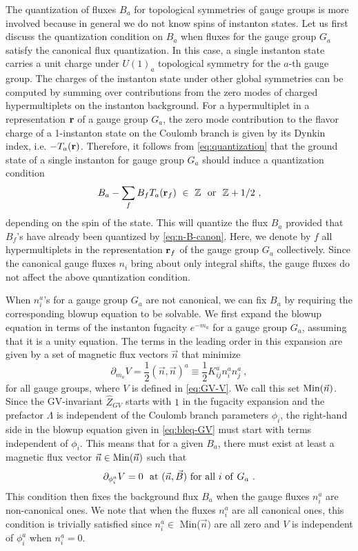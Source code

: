 The quantization of fluxes $B_a$ for topological symmetries of gauge groups is more involved because in general we do not know spins of instanton states. Let us first discuss the quantization condition on $B_a$ when fluxes for the gauge group $G_a$ satisfy the canonical flux quantization. In this case, a single instanton state carries a unit charge under $U(1)_a$ topological symmetry for the $a$-th gauge group. The charges of the instanton state under other global symmetries can be computed by summing over contributions from the zero modes of charged hypermultiplets on the instanton background. For a hypermultiplet in a representation ${\bf r}$ of a gauge group $G_a$, the zero mode contribution to the flavor charge of a 1-instanton state on the Coulomb branch is given by its Dynkin index, i.e. $-T_a({\bf r})$. Therefore, it follows from \eqref{eq:quantization} that the ground state of a single instanton for gauge group $G_a$ should induce a quantization condition
\begin{equation}\label{eq:inst-flux}
	B_a-\sum_f B_f T_a({\bf r}_f) \  \in \ \mathbb{Z} \ \ {\rm or} \ \ \mathbb{Z}+1/2 \ ,
\end{equation} 
depending on the spin of the state. This will quantize the flux $B_a$ provided that $B_f$'s have already been quantized by \eqref{eq:n-B-canon}. Here, we denote by $f$ all hypermultiplets in the representation ${\bf r}_f$ of the gauge group $G_a$ collectively. Since the canonical gauge fluxes $n_i$ bring about only integral shifts, the gauge fluxes do not affect the above quantization condition.

When $n_i^a$'s for a gauge group $G_a$ are not canonical, we can fix $B_a$ by requiring the corresponding blowup equation to be solvable.
We first expand the blowup equation in terms of the instanton fugacity $e^{-m_a}$ for a gauge group $G_a$, assuming that it is a unity equation. The terms in the leading order in this expansion are given by a set of magnetic flux vectors $\vec{n}$ that minimize
\begin{equation}
	\partial_{m_a}V = \frac{1}{2}(\vec{n},\vec{n})^a\equiv \frac{1}{2} K^a_{ij}n^a_i n^a_j \ ,
\end{equation}
for all gauge groups, where $V$ is defined in \eqref{eq:GV-V}. We call this set ${\rm Min}(\vec{n})$. Since the GV-invariant $\hat{Z}_{GV}$ starts with $1$ in the fugacity expansion and the prefactor $\Lambda$ is independent of the Coulomb branch parameters $\phi_i$, the right-hand side in the blowup equation given in \eqref{eq:bleq-GV} must start with terms independent of $\phi_i$. This means that for a given $B_a$, there must exist at least a magnetic flux vector $\vec{n}\in {\rm Min}(\vec{n})$ such that
\begin{equation}\label{eq:Bj-cond1}
	\partial_{\phi^a_i}V = 0 \ \ {\rm at} \ (\vec{n},\vec{B}) \  {\rm for} \ {\rm all} \ i \ {\rm of} \ G_a \ .
\end{equation}
This condition then fixes the background flux $B_a$ when the gauge fluxes $n^a_i$ are non-canonical ones. We note that when the fluxes $n^a_i$ are all canonical ones, this condition is trivially satisfied since $n^a_i\in$ Min($\vec{n})$ are all zero and $V$ is independent of $\phi^a_i$ when $n^a_i=0$.

